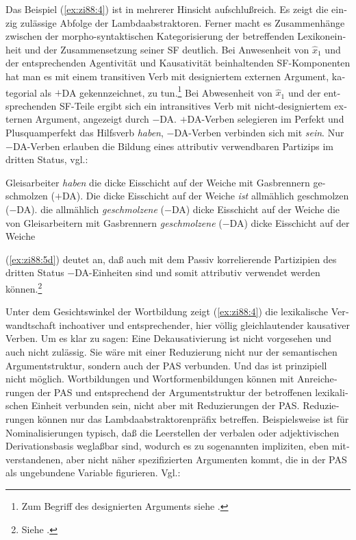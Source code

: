 \documentclass[output=paper,colorlinks,citecolor=brown, booklanguage=german]{langscibook}
\begin{document}
\begin{otherlanguage}{german}
\noindent Das Beispiel (\ref{ex:zi88:4}) ist in mehrerer Hinsicht aufschlußreich. Es zeigt die einzig zulässige Abfolge der Lambdaabstraktoren. Ferner macht es Zusammenhänge zwi\-schen der morpho-syntaktischen Kategorisierung der betreffenden Lexikoneinheit und der Zusammensetzung seiner SF deutlich. Bei Anwesenheit von $\hat{x}_1$ und der entsprechenden Agentivität und Kausativität beinhaltenden SF-Kom\-po\-nen\-ten hat man es mit einem transitiven Verb mit designiertem externen Argument, kategorial als $+$DA gekennzeichnet, zu tun.\footnote{Zum Begriff des designierten Arguments siehe \citet{Haider1984,Haider1986b}.} Bei Abwesenheit von $\hat{x}_1$ und der entsprechenden SF-Teile ergibt sich ein intransitives Verb mit nicht-designiertem externen Argument, angezeigt durch $-$DA. $+$DA-Verben selegieren im Perfekt und Plusquamperfekt das Hilfsverb \textit{haben}, $-$DA-Verben verbinden sich mit \textit{sein}. Nur $-$DA-Verben erlauben die Bildung eines attributiv verwendbaren Partizips im dritten Status, vgl.:

\ea\label{ex:zi88:5}
    \ea\label{ex:zi88:5a} Gleisarbeiter \textit{haben} die dicke Eisschicht auf der Weiche mit Gasbrennern geschmolzen ($+$DA).
    \ex\label{ex:zi88:5b} Die dicke Eisschicht auf der Weiche \textit{ist} allmählich geschmolzen ($-$DA).
    \ex\label{ex:zi88:5c} die allmählich \textit{geschmolzene} ($-$DA) dicke Eisschicht auf der Weiche
    \ex\label{ex:zi88:5d} die von Gleisarbeitern mit Gasbrennern \textit{geschmolzene} ($-$DA) dicke Eisschicht auf der Weiche
\z\z 

\noindent (\ref{ex:zi88:5d}) deutet an, daß auch mit dem Passiv korrelierende Partizipien des dritten Status $-$DA-Einheiten sind und somit attributiv verwendet werden können.\footnote{Siehe \citet{Zimmermann1988-druck}.}

Unter dem Gesichtswinkel der Wortbildung zeigt (\ref{ex:zi88:4}) die lexikalische Ver\-wandt\-schaft inchoativer und entsprechender, hier völlig gleichlautender kausativer Verben. Um es klar zu sagen: Eine Dekausativierung ist nicht vorgesehen und auch nicht zulässig. Sie wäre mit einer Reduzierung nicht nur der semantischen Argumentstruktur, sondern auch der PAS verbunden. Und das ist prinzipiell nicht möglich. Wortbildungen und Wortformenbildungen können mit Anreicherungen der PAS und entsprechend der Argumentstruktur der betroffenen lexikalischen Einheit verbunden sein, nicht aber mit Reduzierungen der PAS. Reduzierungen können nur das Lambdaabstraktorenpräfix betreffen. Bei\-spiels\-wei\-se ist für Nominalisierungen typisch, daß die Leerstellen der verbalen oder adjektivischen Derivationsbasis weglaßbar sind, wodurch es zu so\-ge\-nann\-ten impliziten, eben mitverstandenen, aber nicht näher spezifizierten Argumenten kommt, die in der PAS als ungebundene Variable figurieren. Vgl.:


\end{otherlanguage}
\end{document}
